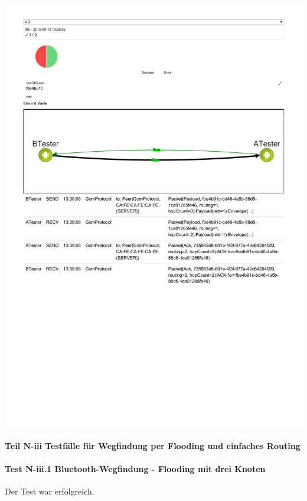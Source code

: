 \includegraphics[trim=0 200 0 0,clip,scale=0.8]{belege/manuelle-tests/netzwerk/Dashboardauszuege/Netzwerktest_n-ii-3.pdf}
\clearpage


\paragraph{Teil N-iii Testfälle für Wegfindung per Flooding und einfaches Routing}

\paragraph{Test N-iii.1 Bluetooth-Wegfindung - Flooding mit drei Knoten}

Der Test war erfolgreich.

